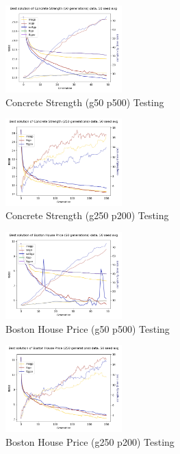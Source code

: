\documentclass[a4paper, twocolumn]{article}
\begin{document}
\begin{figure}[t]
	\caption{Concrete Strength (g50 p500) Testing}
	\includegraphics[width=0.40\textwidth]{Concrete Strength (50 generations)-best-evo}
\end{figure}
\begin{figure}[t]
	\caption{Concrete Strength (g250 p200) Testing}
	\includegraphics[width=0.40\textwidth]{Concrete Strength (250 generations)-best-evo}
\end{figure}
\begin{figure}[t]
	\caption{Boston House Price (g50 p500) Testing}
	\includegraphics[width=0.40\textwidth]{Boston House Price (50 generations)-best-evo}
\end{figure}
\begin{figure}[t]
	\caption{Boston House Price (g250 p200) Testing}
	\includegraphics[width=0.40\textwidth]{Boston House Price (250 generations)-best-evo}
\end{figure}
\end{document}
